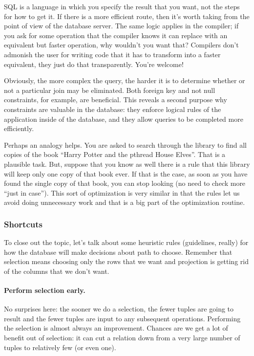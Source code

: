 SQL is a language in which you specify the result that you want, not the steps for how to get it. If there is a more efficient route, then it's worth taking from the point of view of the database server. The same logic applies in the compiler; if you ask for some operation that the compiler knows it can replace with an equivalent but faster operation, why wouldn't you want that? Compilers don't admonish the user for writing code that it has to transform into a faster equivalent, they just do that transparently. You're welcome!

Obviously, the more complex the query, the harder it is to determine whether or not a particular join may be eliminated. Both foreign key and not null constraints, for example, are beneficial. This reveals a second purpose why constraints are valuable in the database: they enforce logical rules of the application inside of the database, and they allow queries to be completed more efficiently.

Perhaps an analogy helps. You are asked to search through the library to find all copies of the book ``Harry Potter and the pthread House Elves''. That is a plausible task. But, suppose that you know as well there is a rule that this library will keep only one copy of that book ever. If that is the case, as soon as you have found the single copy of that book, you can stop looking (no need to check more ``just in case''). This sort of optimization is very similar in that the rules let us avoid doing unnecessary work and that is a big part of the optimization routine.

\subsubsection*{Shortcuts}

To close out the topic, let's talk about some heuristic rules (guidelines, really) for how the database will make decisions about path to choose. Remember that selection means choosing only the rows that we want and projection is getting rid of the columns that we don't want. 

\paragraph{Perform selection early.} No surprises here: the sooner we do a selection, the fewer tuples are going to result and the fewer tuples are input to any subsequent operations. Performing the selection is almost always an improvement. Chances are we get a lot of benefit out of selection: it can cut a relation down from a very large number of tuples to relatively few (or even one). 

